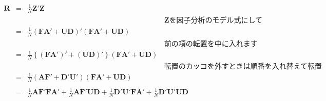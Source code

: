 \begin{equation}
	\begin{array}{lll}
		\bm{R} & = & \frac{1}{N} \bm{Z}'\bm{Z}                                                                                                                                                      \\
		       &   & \hspace{8cm}\text{$\bm{Z}$を因子分析のモデル式にして}                                                                                                                                       \\
		       & = & \frac{1}{N}(\bm{F} \bm{A} ' + \bm{U} \bm{D})'(\bm{F} \bm{A} ' + \bm{U} \bm{D})                                                                                                 \\
		       &   & \hspace{8cm}\text{前の項の転置を中に入れます}                                                                                                                                               \\
		       & = & \frac{1}{N}\left \{ (\bm{F} \bm{A} ')'+(\bm{U} \bm{D})' \right \}(\bm{F} \bm{A} ' + \bm{U} \bm{D})                                                                             \\
		       &   & \hspace{8cm}\text{転置のカッコを外すときは順番を入れ替えて転置}                                                                                                                                      \\
		       & = & \frac{1}{N}(\bm{A} \bm{F} ' + \bm{D}' \bm{U} ')(\bm{F} \bm{A} ' + \bm{U} \bm{D})                                                                                               \\
		       &   & \hspace{8cm}                                                                                                                                                                   \\
		       & = & \frac{1}{N}\bm{A} \bm{F}' \bm{F} \bm{A}' + \frac{1}{N} \bm{A} \bm{F}' \bm{U} \bm{D} + \frac{1}{N} \bm{D}' \bm{U} ' \bm{F} \bm{A} ' + \frac{1}{N} \bm{D}' \bm{U}' \bm{U} \bm{D} \\
	\end{array}
\end{equation}
